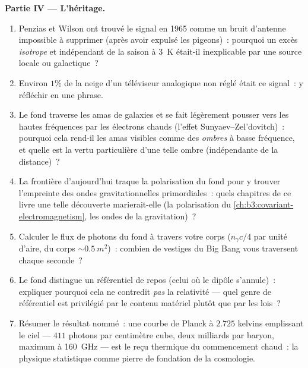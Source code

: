 \begin{problem}
\medskip\noindent\textbf{Partie IV --- L'héritage.}
\begin{enumerate}[resume]
  \item Penzias et Wilson ont trouvé le signal en 1965 comme un
        bruit d'antenne impossible à supprimer (après avoir expulsé
        les pigeons)~: pourquoi un excès \emph{isotrope} et
        indépendant de la saison à \qty{3}{K} était-il inexplicable
        par une source locale ou galactique~?
  \item Environ $1\%$ de la neige d'un téléviseur analogique non
        réglé était ce signal~: y réfléchir en une phrase.
  \item Le fond traverse les amas de galaxies et se fait légèrement
        pousser vers les hautes fréquences par les électrons chauds
        (l'effet Sunyaev--Zel'dovitch)~: pourquoi cela rend-il les
        amas visibles comme des \emph{ombres} à basse fréquence, et
        quelle est la vertu particulière d'une telle ombre
        (indépendante de la distance)~?
  \item La frontière d'aujourd'hui traque la polarisation du fond
        pour y trouver l'empreinte des ondes gravitationnelles
        primordiales~: quels chapitres de ce livre une telle
        découverte marierait-elle
        (la polarisation du \cref{ch:b3:covariant-electromagnetism},
        les ondes de la gravitation)~?
  \item Calculer le flux de photons du fond à travers votre corps
        ($n_\gamma c/4$ par unité d'aire,  du corps
        $\sim\qty{0.5}{m^2}$)~: combien de vestiges du Big Bang
        vous traversent chaque seconde~?
  \item Le fond distingue un référentiel de repos (celui où le
        dipôle s'annule)~: expliquer pourquoi cela ne contredit
        \emph{pas} la relativité --- quel genre de référentiel est
        privilégié par le contenu matériel plutôt que par les
        lois~?
  \item Résumer le résultat nommé~: une courbe de Planck à $2.725$
        kelvins emplissant le ciel --- $411$ photons par centimètre
        cube, deux milliards par baryon, maximum à
        \qty{160}{GHz} --- est le reçu thermique du commencement
        chaud~: la physique statistique comme pierre de fondation
        de la cosmologie.
\end{enumerate}
\end{problem}

